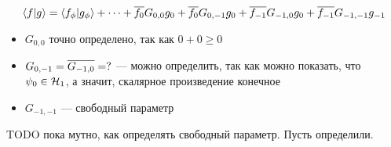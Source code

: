 \[
\ip{f}{g} = \ip{f_\phi}{g_\phi} + \dots + \cconj{f_0} G_{0,0} g_0 + \cconj{f_0} G_{0, -1} g_0 + \cconj{f_{-1}} G_{-1, 0} g_0 + \cconj{f_{-1}} G_{-1, -1} g_{-1}
\]

\begin{itemize}
\item $G_{0, 0}$ точно определено, так как $0 + 0 \ge 0$
\item $G_{0, -1} = \overline{G_{-1, 0}} = ?$ — можно определить, так как можно показать, что $\psi_0 \in \mathcal{H}_{1}$, а значит, скалярное произведение конечное
\item $G_{-1, -1}$ — свободный параметр
\end{itemize}

TODO пока мутно, как определять свободный параметр. Пусть определили.

